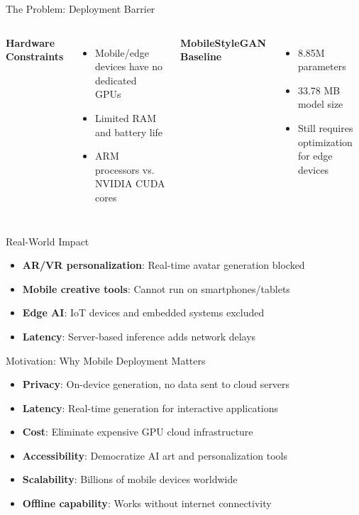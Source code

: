 \documentclass[aspectratio=169,xcolor=dvipsnames]{beamer}
\begin{document}
\begin{frame}{The Problem: Deployment Barrier}
    \begin{columns}
        \textbf{Hardware Constraints}
        \begin{itemize}
            \item Mobile/edge devices have no dedicated GPUs
            \item Limited RAM and battery life
            \item ARM processors vs. NVIDIA CUDA cores
        \end{itemize}
        
        \textbf{MobileStyleGAN Baseline}
        \begin{itemize}
            \item 8.85M parameters
            \item 33.78 MB model size
            \item Still requires optimization for edge devices
        \end{itemize}
    \end{columns}
    
    \vspace{0.5cm}
    
    \begin{block}{Real-World Impact}
        \begin{itemize}
            \item \textbf{AR/VR personalization}: Real-time avatar generation blocked
            \item \textbf{Mobile creative tools}: Cannot run on smartphones/tablets
            \item \textbf{Edge AI}: IoT devices and embedded systems excluded
            \item \textbf{Latency}: Server-based inference adds network delays
        \end{itemize}
    \end{block}
\end{frame}

\begin{frame}{Motivation: Why Mobile Deployment Matters}
    \begin{itemize}
        \item \textbf{Privacy}: On-device generation, no data sent to cloud servers
        \item \textbf{Latency}: Real-time generation for interactive applications
        \item \textbf{Cost}: Eliminate expensive GPU cloud infrastructure
        \item \textbf{Accessibility}: Democratize AI art and personalization tools
        \item \textbf{Scalability}: Billions of mobile devices worldwide
        \item \textbf{Offline capability}: Works without internet connectivity
    \end{itemize}
\end{frame}
\end{document}
